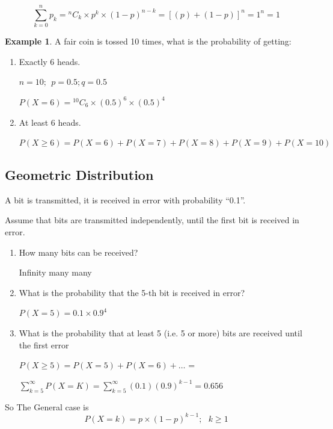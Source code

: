 \documentclass[12pt]{article}
\theoremstyle{definition}
\newtheorem{exmp}{Example}[section]
\newcommand*{\Comb}[2]{{}^{#1}C_{#2}}%
\begin{document}
\begin{equation}
    \sum_{k = 0}^{n} p_k  = \Comb{n}{k} \times p^k \times (1-p)^{n - k} = [(p)+(1-p)]^n = 1 ^ n = 1
\end{equation}    
\begin{exmp}
    A fair coin is tossed 10 times, what is the probability of getting:
    \begin{enumerate}
        \item  Exactly 6 heads.
            \begin{center}
                $ n = 10; \ \ p = 0.5; q = 0.5 $ 
            \end{center}   
            \begin{center}
                $P(X = 6) = \Comb{10}{6} \times (0.5)^6 \times (0.5)^4   $ 
            \end{center}   
        \item  At least 6 heads.
            \begin{center}
                $P(X \geq 6) = P(X = 6) + P(X = 7) + P(X = 8) + P(X = 9) + P(X = 10)  $
            \end{center}   
    \end{enumerate}
\end{exmp}    

\subsection{Geometric Distribution}

A bit is transmitted, it is received in error with probability “0.1”.

Assume that bits are transmitted independently, until the first bit is received
in error.
\begin{enumerate}

    \item How many bits can be received?
        \begin{center}
            Infinity many many
        \end{center}
    \item What is the probability that the 5-th bit is received in error?
        \begin{center}
            $  P(X = 5) = 0.1 \times 0.9^4 $
        \end{center}
    \item What is the probability that at least 5 (i.e. 5 or more) bits are received until the first error
        \begin{center}
            $  P(X \geq 5) = P(X = 5) + P(X = 6) + \dots $  =
        \end{center}
        \begin{center}
            $  \displaystyle \sum_{k = 5}^{\infty} P(X = K) = \sum_{k = 5}^{\infty}(0.1)(0.9)^{k-1} = 0.656$
        \end{center}

\end{enumerate}
So The General case is 
\begin{equation}
    P(X = k) = p \times (1 - p)^{k-1} ; \ \ \ k \geq 1
\end{equation}    
\end{document}
